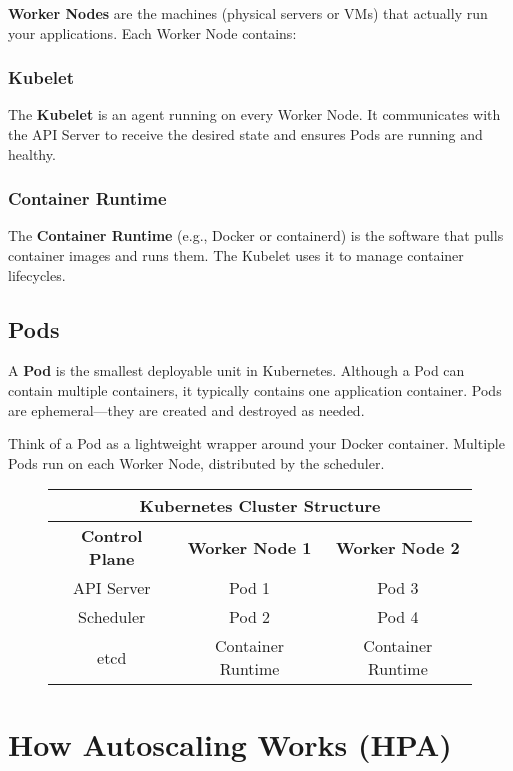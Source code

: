 \documentclass[12pt,a4paper]{article}
\begin{document}
\textbf{Worker Nodes} are the machines (physical servers or VMs) that actually run your applications. Each Worker Node contains:

\subsubsection{Kubelet}

The \textbf{Kubelet} is an agent running on every Worker Node. It communicates with the API Server to receive the desired state and ensures Pods are running and healthy.

\subsubsection{Container Runtime}

The \textbf{Container Runtime} (e.g., Docker or containerd) is the software that pulls container images and runs them. The Kubelet uses it to manage container lifecycles.

\subsection{Pods}

A \textbf{Pod} is the smallest deployable unit in Kubernetes. Although a Pod can contain multiple containers, it typically contains one application container. Pods are ephemeral—they are created and destroyed as needed.

\begin{tipbox}
Think of a Pod as a lightweight wrapper around your Docker container. Multiple Pods run on each Worker Node, distributed by the scheduler.
\end{tipbox}

\begin{figure}[H]
\centering
\begin{tabular}{|c|c|c|}
\hline
\multicolumn{3}{|c|}{\textbf{Kubernetes Cluster Structure}} \\
\hline
\textbf{Control Plane} & \textbf{Worker Node 1} & \textbf{Worker Node 2} \\
\hline
API Server & Pod 1 & Pod 3 \\
Scheduler & Pod 2 & Pod 4 \\
etcd & Container Runtime & Container Runtime \\
\hline
\end{tabular}
\end{figure}

\section{How Autoscaling Works (HPA)}
\end{document}
